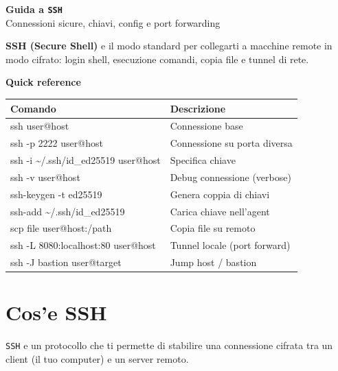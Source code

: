 \documentclass[a4paper,11pt]{article}
\begin{document}
\vspace*{1.5cm}

{\Huge\bfseries\color{MainColor} Guida a \texttt{SSH}} \\[0.4cm]
{\Large\color{AccentColor} Connessioni sicure, chiavi, config e port forwarding}

\vspace{1cm}

\begin{infobox}
\textbf{SSH (Secure Shell)} e il modo standard per collegarti a macchine remote in modo cifrato: login shell, esecuzione comandi, copia file e tunnel di rete.
\end{infobox}

\vspace{0.5cm}

\begin{codebox}
\textbf{Quick reference}

\renewcommand{\arraystretch}{1.2}
\begin{tabularx}{\textwidth}{>{\ttfamily}l X}
\toprule
Comando & Descrizione \\
\midrule
ssh user@host & Connessione base \\
ssh -p 2222 user@host & Connessione su porta diversa \\
ssh -i \textasciitilde/.ssh/id\_ed25519 user@host & Specifica chiave \\
ssh -v user@host & Debug connessione (verbose) \\
ssh-keygen -t ed25519 & Genera coppia di chiavi \\
ssh-add \textasciitilde/.ssh/id\_ed25519 & Carica chiave nell'agent \\
scp file user@host:/path & Copia file su remoto \\
ssh -L 8080:localhost:80 user@host & Tunnel locale (port forward) \\
ssh -J bastion user@target & Jump host / bastion \\
\bottomrule
\end{tabularx}
\end{codebox}

\vspace{0.6cm}
\tableofcontents
\newpage

\section{Cos'e SSH}
\texttt{SSH} e un protocollo che ti permette di stabilire una connessione cifrata tra un client (il tuo computer) e un server remoto.
\end{document}
